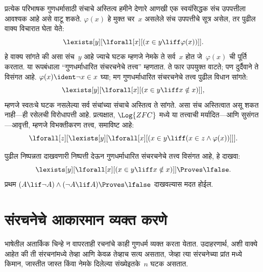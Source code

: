 प्रत्येक परिभाषक गुणधर्मासाठी संचाचे अस्तित्व हमीने देणारे आणखी एक
स्वयंसिद्धक संच उपपत्तीला आवश्यक आहे असे वाटू शकते. $\varphi(x)$ हे मुक्त
चर~$x$ असलेले संच उपपत्तीचे सूत्र असेल, तर पुढील वाक्य विचारात घेता
येते:
\[\lexists[y][\lforall[x][(x \in y \liff \varphi(x))]].
\]
हे वाक्य सांगते की असा संच~$y$ आहे ज्याचे घटक म्हणजे नेमके
ते सर्व~$x$ होत जे~$\varphi(x)$ ची पूर्ति करतात. या रूपबंधाला ``गुणधर्माधारित
संचरचनेचे तत्त्व'' म्हणतात. ते फार उपयुक्त वाटते; पण दुर्दैवाने ते विसंगत
आहे. $\varphi(x) \ident \lnot x \in x$ घ्या; मग गुणधर्माधारित संचरचनेचे तत्त्व
पुढील विधान सांगते:
\[\lexists[y][\lforall[x][(x \in y \liff x \notin x)]],
\]
म्हणजे स्वतःचे घटक नसलेल्या सर्व संचांच्या संचाचे अस्तित्व ते
सांगते. असा संच अस्तित्वात असू शकत नाही---ही रसेलची विरोधापत्ती आहे.
प्रत्यक्षात, $\Log{ZFC}$ मध्ये या तत्त्वाची मर्यादित---आणि सुसंगत---आवृत्ती,
म्हणजे विभक्तीकरण तत्त्व, समाविष्ट आहे:
\[\lforall[z][\lexists[y][\lforall[x][(x \in y \liff (x \in z \land
      \varphi(x))]]].
\]

\begin{prob}
पुढील निष्पन्नता दाखवणारी निष्पत्ती देऊन गुणधर्माधारित संचरचनेचे
तत्त्व विसंगत आहे, हे दाखवा:
\[\lexists[y][\lforall[x][(x \in y \liff x \notin x)]] \Proves \lfalse.
\]
प्रथम $(A \lif \lnot A) \land (\lnot A \lif A)
\Proves \lfalse$ दाखवल्यास मदत होईल.
\end{prob}











\section{संरचनेचे आकारमान व्यक्त करणे}\label{fol:mat:siz:sec}

\begin{explain}
भाषेतील अतार्किक चिन्हे न वापरताही रचनांचे काही गुणधर्म व्यक्त करता येतात.
उदाहरणार्थ, अशी वाक्ये आहेत की ती संरचनांमध्ये तेव्हा आणि केवळ
तेव्हाच सत्य असतात, जेव्हा त्या संरचनेच्या प्रांत मध्ये
किमान, जास्तीत जास्त किंवा नेमके दिलेल्या संख्येइतके~$n$ घटक असतात.
\end{explain}

